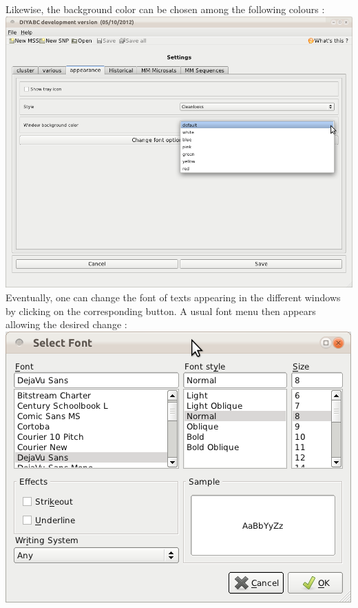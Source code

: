 Likewise, the background color can be chosen among the following colours :\\

\includegraphics[scale=0.33]{gui_pictures/Capture-DIYABC-100.png} \\

Eventually, one can change the font of texts appearing in the different windows by clicking on the corresponding button. A usual font menu then appears allowing the desired change :\\

\includegraphics[scale=0.33]{gui_pictures/Capture-DIYABC-101.png} \\

